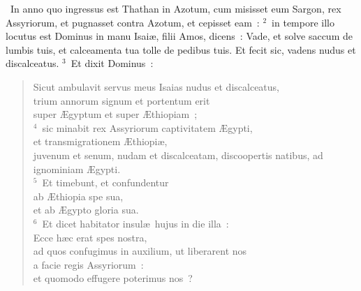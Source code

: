 ~\lettrine[lines=10,image=true,loversize=0.05,lraise=-0.03]{I}{}n anno quo ingressus est Thathan in Azotum, cum misisset eum Sargon, rex Assyriorum, et pugnasset contra Azotum, et cepisset eam~:
${}^{2}$~in tempore illo locutus est Dominus in manu Isai\ae , filii Amos, dicens~: Vade, et solve saccum de lumbis tuis, et calceamenta tua tolle de pedibus tuis. Et fecit sic, vadens nudus et discalceatus.
${}^{3}$~Et dixit Dominus~: \begin{flushleft}\begin{verse}Sicut ambulavit servus meus Isaias nudus et discalceatus,\\ trium annorum signum et portentum erit\\ super \AE gyptum et super \AE thiopiam~;\\
${}^{4}$~sic minabit rex Assyriorum captivitatem \AE gypti,\\ et transmigrationem \AE thiopi\ae ,\\ juvenum et senum, nudam et discalceatam, discoopertis natibus, ad ignominiam \AE gypti.\\
${}^{5}$~Et timebunt, et confundentur\\ ab \AE thiopia spe sua,\\ et ab \AE gypto gloria sua.\\
${}^{6}$~Et dicet habitator insul\ae\ hujus in die illa~:\\ Ecce h\ae c erat spes nostra,\\ ad quos confugimus in auxilium, ut liberarent nos\\ a facie regis Assyriorum~:\\ et quomodo effugere poterimus nos~?\end{verse}\end{flushleft}


